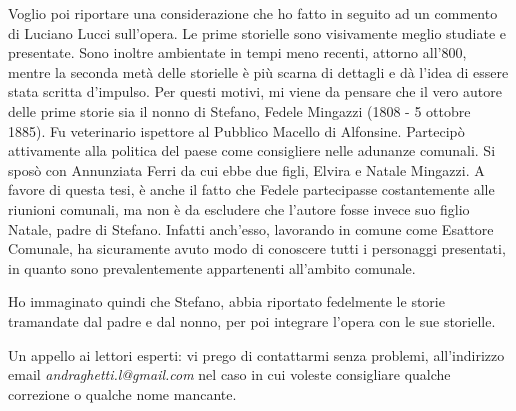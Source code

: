 Voglio poi riportare una considerazione che ho fatto in seguito ad un commento di Luciano Lucci sull'opera. Le prime storielle sono visivamente meglio studiate e presentate. Sono inoltre ambientate in tempi meno recenti, attorno all'800, mentre la seconda metà delle storielle è più scarna di dettagli e dà l'idea di essere stata scritta d'impulso. Per questi motivi, mi viene da pensare che il vero autore delle prime storie sia il nonno di Stefano, Fedele Mingazzi (1808 - 5 ottobre 1885). Fu veterinario ispettore al Pubblico Macello di Alfonsine. Partecipò attivamente alla politica del paese come consigliere nelle adunanze comunali. Si sposò con Annunziata Ferri da cui ebbe due figli, Elvira e Natale Mingazzi. A favore di questa tesi, è anche il fatto che Fedele partecipasse costantemente alle riunioni comunali, ma non è da escludere che l'autore fosse invece suo figlio Natale, padre di Stefano. Infatti anch'esso, lavorando in comune come Esattore Comunale, ha sicuramente avuto modo di conoscere tutti i personaggi presentati, in quanto sono prevalentemente appartenenti all'ambito comunale.\\

\begin{figure}[hbt]%
	\vspace{-1cm}
    \centering
	\vspace{-0.2cm}
\end{figure}

Ho immaginato quindi che Stefano, abbia riportato fedelmente le storie tramandate dal padre e dal nonno, per poi integrare l'opera con le sue storielle.

\vspace{1cm}

Un appello ai lettori esperti: vi prego di contattarmi senza problemi, all'indirizzo email \textit{andraghetti.l@gmail.com} nel caso in cui voleste consigliare qualche correzione o qualche nome mancante.\\

